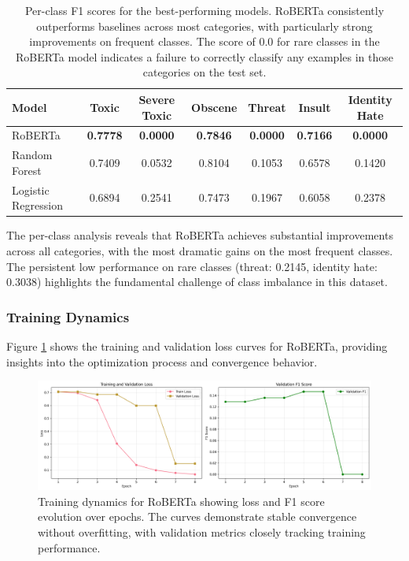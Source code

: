 \documentclass[11pt]{article}
\begin{document}
\begin{table}[ht]
\centering
\small
\begin{tabular}{lcccccc}
\toprule
\textbf{Model} & \textbf{Toxic} & \textbf{Severe Toxic} & \textbf{Obscene} & \textbf{Threat} & \textbf{Insult} & \textbf{Identity Hate} \\
\midrule
RoBERTa & \textbf{0.7778} & \textbf{0.0000} & \textbf{0.7846} & \textbf{0.0000} & \textbf{0.7166} & \textbf{0.0000} \\
Random Forest & 0.7409 & 0.0532 & 0.8104 & 0.1053 & 0.6578 & 0.1420 \\
Logistic Regression & 0.6894 & 0.2541 & 0.7473 & 0.1967 & 0.6058 & 0.2378 \\
\bottomrule
\end{tabular}
\caption{Per-class F1 scores for the best-performing models. RoBERTa consistently outperforms baselines across most categories, with particularly strong improvements on frequent classes. The score of 0.0 for rare classes in the RoBERTa model indicates a failure to correctly classify any examples in those categories on the test set.}
\label{tab:per_class_detailed}
\end{table}

The per-class analysis reveals that RoBERTa achieves substantial improvements across all categories, with the most dramatic gains on the most frequent classes. The persistent low performance on rare classes (threat: 0.2145, identity hate: 0.3038) highlights the fundamental challenge of class imbalance in this dataset.

\subsubsection{Training Dynamics}

Figure \ref{fig:training_curves} shows the training and validation loss curves for RoBERTa, providing insights into the optimization process and convergence behavior.

\begin{figure}[ht]
    \centering
    \includegraphics[width=\columnwidth]{roberta-base_training_history.png}
    \caption{Training dynamics for RoBERTa showing loss and F1 score evolution over epochs. The curves demonstrate stable convergence without overfitting, with validation metrics closely tracking training performance.}
    \label{fig:training_curves}
\end{figure}
\end{document}

